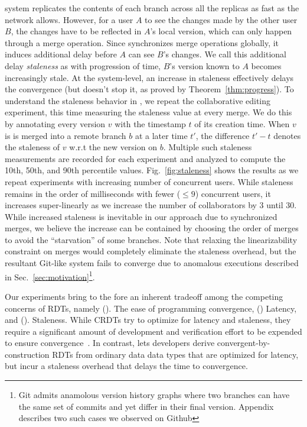 \quark system replicates the contents of each branch across all the
replicas as fast as the network allows. However, for a user $A$ to
see the changes made by the other user $B$, the changes have to be
reflected in $A$'s local version, which can only happen through a
merge operation. Since \quark synchronizes merge operations globally,
it induces additional delay before $A$ can see $B$'s changes. We call
this additional delay \emph{staleness} as with progression of time,
$B$'s version known to $A$ becomes increasingly stale. At the
system-level, an increase in staleness effectively delays the
convergence (but doesn't stop it, as proved by
Theorem~\ref{thm:progress}). To understand the staleness behavior in
\quark, we repeat the collaborative editing experiment, this time
measuring the staleness value at every merge. We do this by annotating
every version $v$ with the timestamp $t$ of its creation time. When
$v$ is is merged into a remote branch $b$ at a later time $t'$, the
difference $t' - t$ denotes the staleness of $v$ w.r.t the new version
on $b$. Multiple such staleness measurements are recorded for each
experiment and analyzed to compute the 10th, 50th, and 90th percentile
values. Fig.~\ref{fig:staleness} shows the results as we repeat
experiments with increasing number of concurrent users. While
staleness remains in the order of milliseconds with fewer ($\leq 9$)
concurrent users, it increases super-linearly as we increase the
number of collaborators by 3 until 30. While increased staleness is
inevitable in our approach due to synchronized merges, we believe the
increase can be contained by choosing the order of merges to avoid the
``starvation'' of some branches. Note that relaxing the
linearizability constraint on merges would completely eliminate the
staleness overhead, but the resultant Git-like system fails to
converge due to anomalous executions described in
Sec.~\ref{sec:motivation}\footnote{
  Git admits anamolous version history graphs where two branches can
  have the same set of commits and yet differ in their final version.
  Appendix describes two such cases we observed on Github}. 

Our experiments bring to the fore an inherent tradeoff among the
competing concerns of RDTs, namely (). The ease of programming
convergence, () Latency, and ().  Staleness. While CRDTs
try to optimize for latency and staleness, they require a significant
amount of development and verification effort to be expended to ensure
convergence~\cite{kleppmann2017}. In contrast, \quark lets developers
derive convergent-by-construction RDTs from ordinary data data types
that are optimized for latency, but incur a staleness overhead that
delays the time to convergence. 


